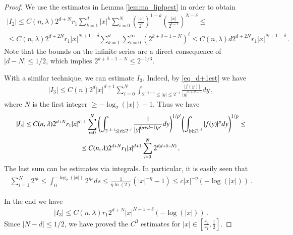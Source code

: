 \documentclass[11pt]{article}
\begin{document}
\begin{proof}
We use the estimates in Lemma \ref{lemma_liplpest} in order to obtain
\begin{gather}
 {\left|{I_2}\right|}\leq C(n,\lambda)2^{d+N}r_1  \sum_{k=1}^d {\left|x\right|} ^k \sum_{i=0}^{N} {\left({\frac{{\left|x\right|}}{2^i}}\right)}^{1-k}{\left({\frac{{\left|x\right|}}{2^{i-1}}}\right)}^{N-\delta}\leq \\
 \leq C(n,\lambda)2^{d+2N} r_1 {\left|x\right|}^{N+1-\delta}\sum_{k=1}^d \sum_{i=0}^{\infty} {\left({2^{k+\delta-1-N}}\right)}^i\leq C(n,\lambda)d2^{d+2N}r_1  {\left|x\right|}^{N+1-\delta}\, .
\end{gather}
Note that the bounds on the infinite series are a direct consequence of ${\left|{d-N}\right|}\leq 1/2$, which implies $2^{k+\delta-1-N}\leq 2^{-1/3}$. 

With a similar technique, we can estimate $I_3$. Indeed, by \eqref{eq_d+1est} we have
\begin{gather}
 {\left|{I_3}\right|} \leq C(n) 2^d{\left|x\right|}^{d+1} \sum_{i=0}^N \int_{2^{-1-i} \leq {\left|y\right|} \leq 2^{-i} } \frac{{\left|{f(y)}\right|}}{{\left|y\right|} ^{n+d-1}} dy\, ,
\end{gather}
where $N$ is the first integer $\geq -\log_2({\left|x\right|})-1$. Thus we have
\begin{gather}
 {\left|{I_3}\right|} \leq C(n,\lambda)2^{d+N}r_1{\left|x\right|}^{d+1} \sum_{i=0}^N {\left({\int_{2^{-1-i} \leq {\left|y\right|} \leq 2^{-i} } \frac{1}{{\left|y\right|} ^{(n+d-1)p'}} dy}\right)}^{1/p'}{\left({\int_{{\left|y\right|} \leq 2^{-i} } {\left|{f(y)}\right|}^p dy}\right)}^{1/p}\leq\\
 \notag \leq C(n,\lambda)2^{d+N}r_1{\left|x\right|}^{d+1} \sum_{i=0}^N 2^{i(d+\delta-N)}\, .
\end{gather}
The last sum can be estimates via integrals. In particular, it is easily seen that
\begin{gather}
 \sum_{i=1}^N 2^{\eta i} \leq \int_0 ^ {-\log_2 ({\left|x\right|})} 2^{\eta s} ds \leq  \frac{1}{\eta \ln(2)}{\left({{\left|x\right|} ^{-\eta}-1}\right)}\leq c {\left|x\right|} ^{-\eta} (-\log({\left|x\right|}))\, .
\end{gather}

In the end we have
\begin{gather}
 {\left|{I_3}\right|} \leq C(n,\lambda) r_1 2^{d+N} {\left|x\right|}^{N+1-\delta} (-\log({\left|x\right|}))\, .
\end{gather}
Since ${\left|{N-d}\right|}\leq 1/2$, we have proved the $C^0$ estimates for ${\left|x\right|} \in {\left[{\frac {r_2}{r_1}, \frac 1 2}\right]}$.


\end{proof}
\end{document}
